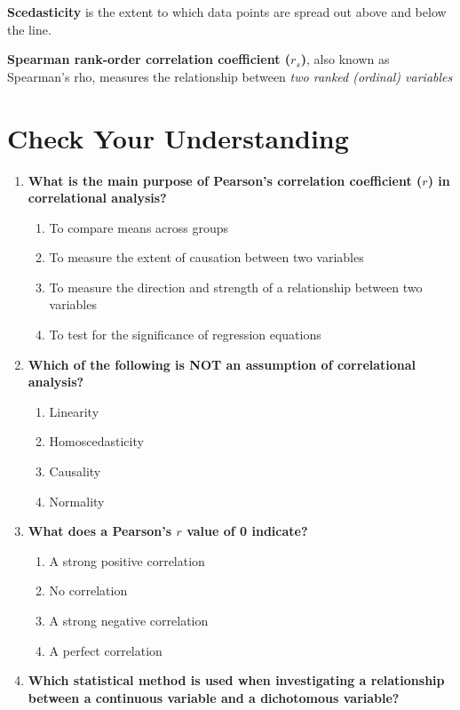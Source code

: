 \documentclass[
  letterpaper,
  DIV=11,
  numbers=noendperiod]{scrreprt}
\begin{document}
\textbf{Scedasticity} is the extent to which data points are spread out
above and below the line.

\textbf{Spearman rank-order correlation coefficient (\(r_s\))}, also
known as Spearman's rho, measures the relationship between \emph{two
ranked (ordinal) variables}

\section*{Check Your Understanding}\label{check-your-understanding-10}


\begin{enumerate}
\def\labelenumi{\arabic{enumi}.}
\item
  \textbf{What is the main purpose of Pearson's correlation coefficient
  (\(r\)) in correlational analysis?}

  \begin{enumerate}
  \def\labelenumii{\alph{enumii}.}
  \item
    To compare means across groups
  \item
    To measure the extent of causation between two variables
  \item
    To measure the direction and strength of a relationship between two
    variables
  \item
    To test for the significance of regression equations
  \end{enumerate}
\item
  \textbf{Which of the following is NOT an assumption of correlational
  analysis?}

  \begin{enumerate}
  \def\labelenumii{\alph{enumii}.}
  \item
    Linearity
  \item
    Homoscedasticity
  \item
    Causality
  \item
    Normality
  \end{enumerate}
\item
  \textbf{What does a Pearson's \(r\) value of 0 indicate?}

  \begin{enumerate}
  \def\labelenumii{\alph{enumii}.}
  \item
    A strong positive correlation
  \item
    No correlation
  \item
    A strong negative correlation
  \item
    A perfect correlation
  \end{enumerate}
\item
  \textbf{Which statistical method is used when investigating a
  relationship between a continuous variable and a dichotomous
  variable?}


\end{enumerate}
\end{document}
